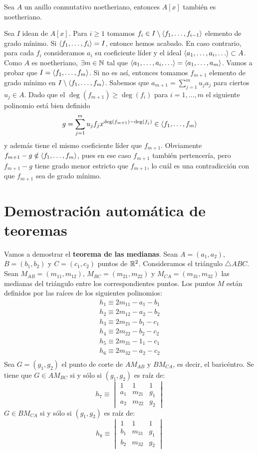 \documentclass[twoside]{report}
\def\a{\alpha}
\def\b{\beta}
\begin{document}
\begin{teorema} Sea $A$ un anillo conmutativo noetheriano, entonces $A[x]$ también es noetheriano.
\end{teorema}
\begin{dem}
Sea $I$ idean de $A[x]$. Para $i\geq 1$ tomamos $f_i \in I\setminus \langle{f_1,\dotsc,f_{i-1}}\rangle$ elemento de grado mínimo. Si $\langle{f_1,\dotsc,f_i}\rangle = I$, entonce hemos acabado. En caso contrario, para cada $f_i$ consideramos $a_i$ su coeficiente líder y el ideal $\langle{a_1,\dotsc,a_i,\dotsc}\rangle\subset A$. Como $A$ es noetheriano, $\exists m\in \mathbb{N}$ tal que $\langle{a_1,\dotsc,a_i,\dotsc}\rangle=\langle{a_1,\dotsc,a_m}\rangle$. Vamos a probar que $I=\langle{f_1,\dotsc,f_m}\rangle$. Si no es así, entonces tomamos $f_{m+1}$ elemento de grado mínimo en $ I\setminus \langle{f_1,\dotsc,f_{m}}\rangle$. Sabemos que $a_{m+1}=\sum_{j=1}^m u_j a_j$ para ciertos $u_j\in A$. Dado que el $\deg(f_{m+1})\geq \deg(f_i)$ para $i=1,\dotsc,m$ el siguiente polinomio está bien definido
$$
g = \sum_{j=1}^m u_jf_jx^{\deg(f_{m+1})-\deg(f_j)} \in \langle{f_1,\dotsc,f_m}\rangle
$$
y además tiene el mismo coeficiente líder que $f_{m+1}$.  Obviamente $f_{m+1}-g \notin \langle{f_1,\dotsc,f_m}\rangle$, pues en ese caso $f_{m+1}$ también pertencería, pero $f_{m+1}-g$ tiene grado menor estricto que $f_{m+1}$, lo cuál es una contradicción con que $f_{m+1}$ sea de grado mínimo.
\end{dem}

\section{Demostración automática de teoremas}
Vamos a demostrar el \textbf{teorema de las medianas}.
Sean $A=(a_1,a_2)$, $B=(b_1,b_2)$ y $C=(c_1,c_2)$ puntos de $\mathbb{R}^2$.
Consideramos el triángulo $\triangle ABC$.
Sean $M_{AB}=(m_{11},m_{12})$, $M_{BC}=(m_{21},m_{22})$ y $M_{CA}=(m_{31},m_{32})$ las medianas del triángulo entre los correspondientes puntos.
Los puntos $M$ están definidos por las raíces de los siguientes polinomios:
\begin{align*}
	h_1 \equiv 2m_{11}-a_1-b_1\\
	h_2 \equiv 2m_{12}-a_2-b_2\\
	h_3 \equiv 2m_{21}-b_1-c_1\\
	h_4 \equiv 2m_{22}-b_2-c_2\\
	h_5 \equiv 2m_{31}-1_1-c_1\\
	h_6 \equiv 2m_{32}-a_2-c_2\\
\end{align*}
Sea $G=(g_1,g_2)$ el punto de corte de $AM_{AB}$ y $BM_{CA}$, es decir, el baricéntro.
Se tiene que $G \in AM_{BC}$ si y sólo si $(g_1,g_2)$ es raíz de:
\[ h_7 \equiv \begin{vmatrix}1 & 1 & 1\\a_1 & m_{21} & g_1\\a_2 & m_{22} & g_2\end{vmatrix} \]
$G \in BM_{CA}$ si y sólo si $(g_1,g_2)$ es raíz de:
\[ h_8 \equiv \begin{vmatrix}1 & 1 & 1\\b_1 & m_{31} & g_1\\b_2 & m_{32} & g_2\end{vmatrix} \]
\end{document}
